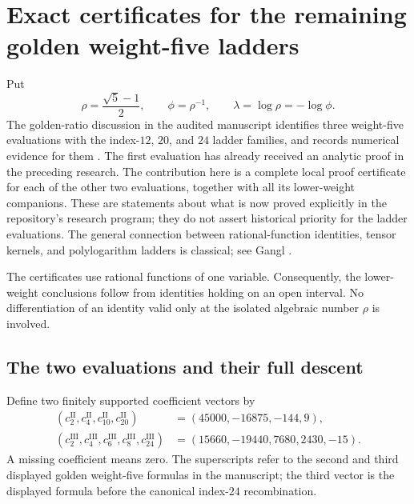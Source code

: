\section{Exact certificates for the remaining golden weight-five ladders}
\label{gold:sec}

Put
\[
 \rho=\frac{\sqrt5-1}{2},\qquad \phi=\rho^{-1},\qquad
 \lambda=\log\rho=-\log\phi.
\]
The golden-ratio discussion in the audited manuscript identifies three
weight-five evaluations with the index-$12$, $20$, and $24$ ladder
families, and records numerical evidence for them \cite{Repo}.
The first evaluation has already received an analytic proof in the
preceding research.  The contribution here is a complete local proof
certificate for each of the other two evaluations, together with all
its lower-weight companions.  These are statements about what is now
proved explicitly in the repository's research program; they do not
assert historical priority for the ladder evaluations.  The general
connection between rational-function identities, tensor kernels, and
polylogarithm ladders is classical; see Gangl \cite{Gangl}.

The certificates use rational functions of one variable.  Consequently,
the lower-weight conclusions follow from identities holding on an open
interval.  No differentiation of an identity valid only at the isolated
algebraic number $\rho$ is involved.

\subsection{The two evaluations and their full descent}

Define two finitely supported coefficient vectors by
\begin{align}
 (c^{\mathrm{II}}_2,c^{\mathrm{II}}_4,c^{\mathrm{II}}_{10},
     c^{\mathrm{II}}_{20})&=(45000,-16875,-144,9),
 \label{gold:eq:cII}\\
 (c^{\mathrm{III}}_2,c^{\mathrm{III}}_4,c^{\mathrm{III}}_6,
     c^{\mathrm{III}}_8,c^{\mathrm{III}}_{24})
     &=(15660,-19440,7680,2430,-15).
 \label{gold:eq:cIII}
\end{align}
A missing coefficient means zero.  The superscripts refer to the
second and third displayed golden weight-five formulas in the
manuscript; the third vector is the displayed formula before the
canonical index-$24$ recombination.

